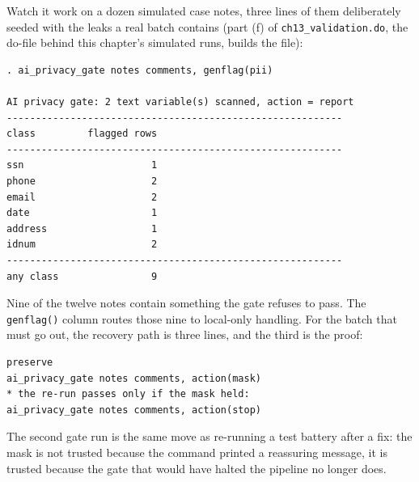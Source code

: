 \documentclass[
    a4paper,
    fontsize=10pt,
    twoside=true,
    numbers=noenddot,
]{kaobook}
\begin{document}
Watch it work on a dozen simulated case notes, three lines of them deliberately seeded with the leaks a real batch contains (part (f) of \texttt{ch13\_validation.do}, the do-file behind this chapter's simulated runs, builds the file):
\par
{\footnotesize
\begin{verbatim}
. ai_privacy_gate notes comments, genflag(pii)

AI privacy gate: 2 text variable(s) scanned, action = report
----------------------------------------------------------
class         flagged rows
----------------------------------------------------------
ssn                      1
phone                    2
email                    2
date                     1
address                  1
idnum                    2
----------------------------------------------------------
any class                9
\end{verbatim}
}
Nine of the twelve notes contain something the gate refuses to pass. The \texttt{genflag()} column routes those nine to local-only handling. For the batch that must go out, the recovery path is three lines, and the third is the proof:
\par
{\footnotesize
\begin{verbatim}
preserve
ai_privacy_gate notes comments, action(mask)
* the re-run passes only if the mask held:
ai_privacy_gate notes comments, action(stop)
\end{verbatim}
}
The second gate run is the same move as re-running a test battery after a fix: the mask is not trusted because the command printed a reassuring message, it is trusted because the gate that would have halted the pipeline no longer does.
\end{document}
